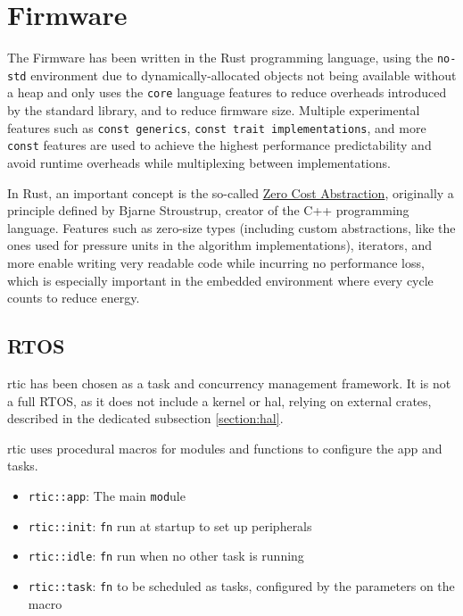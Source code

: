 \section{Firmware}\label{section:firmware}
The Firmware has been written in the Rust programming language, using the \lstinline{no-std} environment due to dynamically-allocated objects not being available without a heap and only uses the \lstinline{core} language features to reduce overheads introduced by the standard library, and to reduce firmware size. 
Multiple experimental features such as \lstinline{const generics}, \lstinline{const trait implementations}, and more \lstinline{const} features are used to achieve the highest performance predictability and avoid runtime overheads while multiplexing between implementations.

In Rust, an important concept is the so-called \href{https://doc.rust-lang.org/beta/embedded-book/static-guarantees/zero-cost-abstractions.html}{Zero Cost Abstraction}, originally a principle defined by Bjarne Stroustrup, creator of the C++ programming language.
Features such as zero-size types (including custom abstractions, like the ones used for pressure units in the algorithm implementations), iterators, and more enable writing very readable code while incurring no performance loss, which is especially important in the embedded environment where every cycle counts to reduce energy.

\subsection{RTOS}
\gls{rtic} has been chosen as a task and concurrency management framework. It is not a full RTOS, as it does not include a kernel or \gls{hal}, relying on external crates, described in the dedicated subsection \ref{section:hal}.

\gls{rtic} uses procedural macros for modules and functions to configure the app and tasks.

\begin{itemize}
    \item \lstinline{rtic::app}: The main \lstinline{mod}ule
    \item \lstinline{rtic::init}: \lstinline{fn} run at startup to set up peripherals
    \item \lstinline{rtic::idle}: \lstinline{fn} run when no other task is running
    \item \lstinline{rtic::task}: \lstinline{fn} to be scheduled as tasks, configured by the parameters on the macro
\end{itemize}


